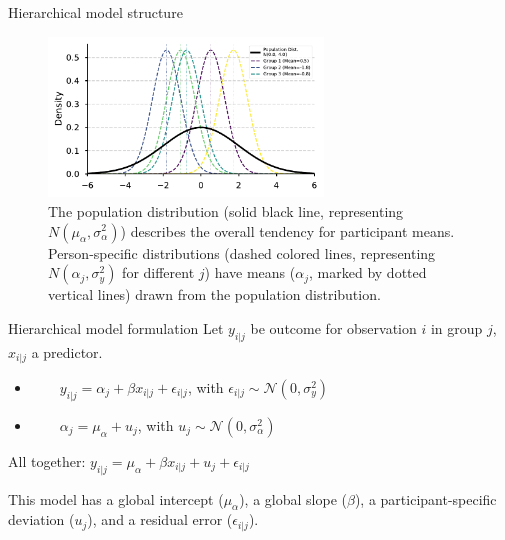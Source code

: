 \documentclass[aspectratio=169]{beamer}
\begin{document}
\begin{frame}{Hierarchical model structure}
    \begin{figure}
        \centering
        \includegraphics[width=0.65\textwidth]{figures/fig_003_multilevel.pdf}
        \caption{The population distribution (solid black line, representing $N(\mu_{\alpha}, \sigma^2_{\alpha})$) describes the overall tendency for participant means. Person-specific distributions (dashed colored lines, representing $N(\alpha_j, \sigma^2_y)$ for different $j$) have means ($\alpha_j$, marked by dotted vertical lines) drawn from the population distribution.}
    \end{figure}
\end{frame}

\begin{frame}[fragile]{Hierarchical model formulation}
    Let $y_{i|j}$ be outcome for observation $i$ in group $j$, $x_{i|j}$ a predictor.

    \begin{itemize}
        \item[]
          $ \qquad y_{i|j} = \alpha_j + \beta x_{i|j} + \epsilon_{i|j}$, with $\epsilon_{i|j} \sim \mathcal{N}(0, \sigma^2_y)$
        \item[]
          $ \qquad \alpha_j = \mu_{\alpha} + u_j$, with $u_j \sim \mathcal{N}(0, \sigma^2_{\alpha})$
    \end{itemize}

    All together: $y_{i|j} = \mu_{\alpha} + \beta x_{i|j} + u_j + \epsilon_{i|j} $

    This model has a global intercept ($\mu_{\alpha}$), a global slope ($\beta$), a participant-specific deviation ($u_j$), and a residual error ($\epsilon_{i|j}$).
\end{frame}
\end{document}
